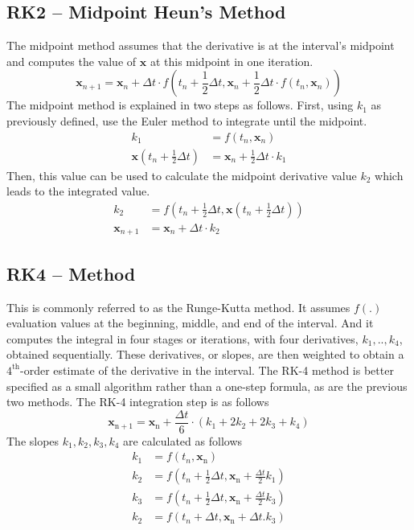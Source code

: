 \subsection{RK2 -- Midpoint Heun's Method}
The midpoint method assumes that the derivative is at the interval's midpoint and computes the value of $\mathbf{x}$ at this midpoint in one iteration.
\begin{equation}
\mathbf{x}_{n+1}=\mathbf{x}_{n}+\Delta t \cdot f\left(t_{n}+\frac{1}{2} \Delta t, \mathbf{x}_{n}+\frac{1}{2} \Delta t \cdot f\left(t_{n}, \mathbf{x}_{n}\right)\right)
\end{equation}
The midpoint method is explained in two steps as follows. First, using $k_1$ as previously defined, use the Euler method to integrate until the midpoint.
\begin{align}
k_{1} &=f\left(t_{n}, \mathbf{x}_{n}\right) \\
\mathbf{x}\left(t_{n}+\frac{1}{2} \Delta t\right) &=\mathbf{x}_{n}+\frac{1}{2} \Delta t \cdot k_{1}
\end{align}
Then, this value can be used to calculate the midpoint derivative value $k_2$ which leads to the integrated value.
\begin{align}
k_{2} &=f\left(t_{n}+\frac{1}{2} \Delta t, \mathbf{x}\left(t_{n}+\frac{1}{2} \Delta t\right)\right) \\
\mathbf{x}_{n+1} &=\mathbf{x}_{n}+\Delta t \cdot k_{2}
\end{align}


\subsection{RK4 -- Method}
This is commonly referred to as the Runge-Kutta method. It assumes $f(.)$ evaluation values at the beginning, middle, and end of the interval. And it computes the integral in four stages or iterations, with four derivatives, $k_1,.. ,k_4$, obtained sequentially. These derivatives, or slopes, are then weighted to obtain a $4^{\text{th}}$-order estimate of the derivative in the interval.
The RK-4 method is better specified as a small algorithm rather than a one-step formula, as are the previous two methods. The RK-4 integration step is as follows
\begin{equation}
\mathbf{x}_{\mathrm{n}+1}=\mathbf{x}_{\mathrm{n}}+\frac{\Delta t}{6} \cdot\left(k_{1}+2 k_{2}+2 k_{3}+k_{4}\right)    
\end{equation}
The slopes $k_{1}, k_{2}, k_{3}, k_{4}$ are calculated as follows
\begin{align}
k_{1}&=f\left(t_{n}, \mathbf{x}_{\mathrm{n}}\right) \\
k_{2}&=f\left(t_{n}+\frac{1}{2} \Delta t, \mathbf{x}_{\mathrm{n}}+\frac{\Delta t}{2} k_{1}\right) \\
k_{3}&=f\left(t_{n}+\frac{1}{2} \Delta t, \mathbf{x}_{\mathrm{n}}+\frac{\Delta t}{2} k_{3}\right) \\
k_{2}&=f\left(t_{n}+\Delta t, \mathbf{x}_{\mathrm{n}}+\Delta t . k_{3}\right)
\end{align}

